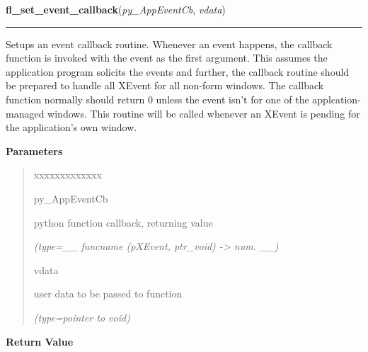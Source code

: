     \label{xformslib:flxbasic:fl_set_event_callback}

    \vspace{0.5ex}

\hspace{.8\funcindent}\begin{boxedminipage}{\funcwidth}

    \raggedright \textbf{fl\_set\_event\_callback}(\textit{py\_AppEventCb}, \textit{vdata})

    \vspace{-1.5ex}

    \rule{\textwidth}{0.5\fboxrule}
\setlength{\parskip}{2ex}
    Setups an event callback routine. Whenever an event happens, the 
    callback function is invoked with the event as the first argument. This
    assumes the application program solicits the events and further, the 
    callback routine should be prepared to handle all XEvent for all 
    non-form windows. The callback function normally should return 0 unless
    the event isn't for one of the applcation-managed windows. This routine
    will be called whenever an XEvent is pending for the application's own 
    window.

\setlength{\parskip}{1ex}
      \textbf{Parameters}
      \vspace{-1ex}

      \begin{quote}
        \begin{Ventry}{xxxxxxxxxxxxx}

          \item[py\_AppEventCb]

          python function callback, returning value

            {\it (type=\_\_ funcname (pXEvent, ptr\_void) -{\textgreater} num. \_\_)}

          \item[vdata]

          user data to be passed to function

            {\it (type=pointer to void)}

        \end{Ventry}

      \end{quote}

      \textbf{Return Value}
    \vspace{-1ex}


\end{boxedminipage}

